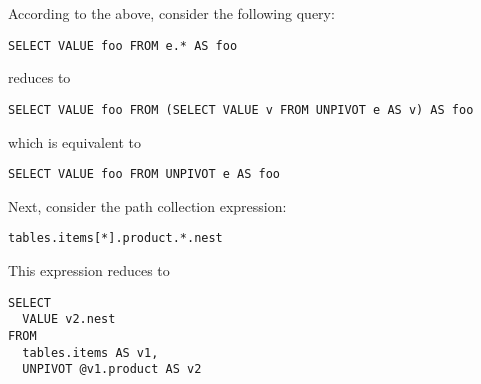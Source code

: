 \begin{example} According to the above, consider the following query:

\begin{lstlisting}
SELECT VALUE foo FROM e.* AS foo
\end{lstlisting}

\noindent reduces to

\begin{lstlisting}
SELECT VALUE foo FROM (SELECT VALUE v FROM UNPIVOT e AS v) AS foo
\end{lstlisting}

\noindent which is equivalent to

\begin{lstlisting}
SELECT VALUE foo FROM UNPIVOT e AS foo
\end{lstlisting}

\noindent Next, consider the path collection expression:

\begin{lstlisting}
tables.items[*].product.*.nest
\end{lstlisting}

\noindent This expression reduces to 

\begin{lstlisting}
SELECT
  VALUE v2.nest
FROM
  tables.items AS v1,
  UNPIVOT @v1.product AS v2
\end{lstlisting}

\end{example}
